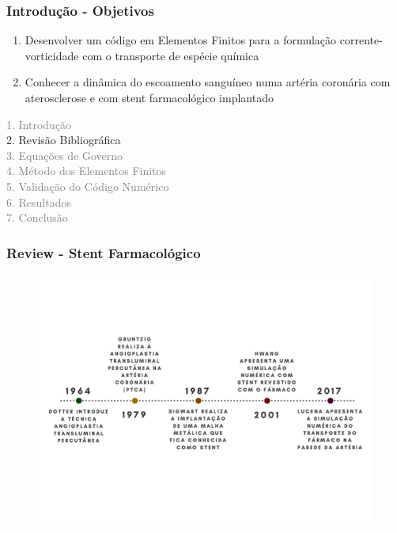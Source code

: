 
\begin{frame} 
\frametitle{Introdução - Objetivos}
 \vspace{-1cm}
\begin{enumerate}
 \item Desenvolver um código em Elementos Finitos para a formulação 
    corrente-vorticidade com o transporte de espécie química \\

 \vspace{0.8cm}

 \item Conhecer a dinâmica do escoamento sanguíneo numa artéria coronária com aterosclerose
    e com stent farmacológico implantado
\end{enumerate}
\end{frame}


\begin{frame}
  \vspace{-1cm}
  \textcolor{gray}{1. Introdução}\\[0.1cm]
  2. Revisão Bibliográfica\\[0.1cm]
  \textcolor{gray}{3. Equações de Governo}\\[0.1cm]
  \textcolor{gray}{4. Método dos Elementos Finitos}\\[0.1cm]
  \textcolor{gray}{5. Validação do Código Numérico}\\[0.1cm]
  \textcolor{gray}{6. Resultados}\\[0.1cm]
  \textcolor{gray}{7. Conclusão}
\end{frame}



\begin{frame} 
\frametitle{Review - Stent Farmacológico}
\begin{figure}
  \vspace{-1.3cm}
  \includegraphics[scale=0.42]{images/stent_review.pdf}
\end{figure}
\end{frame}

